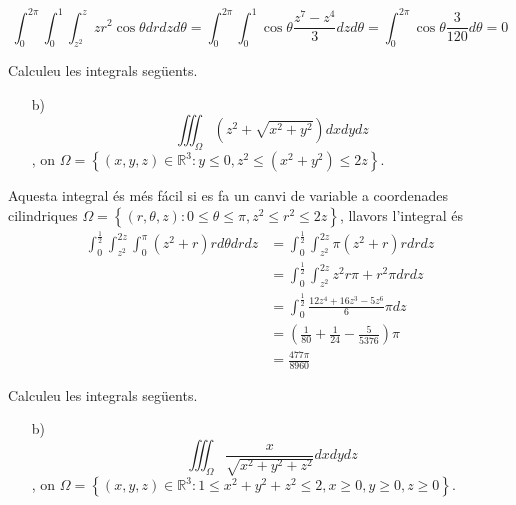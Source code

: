 \documentclass[a4paper, 12pt]{article}
\begin{document}
    \begin{solucio}
        $$\int_{0}^{2\pi}\int_{0}^{1}\int_{z^2}^{z} zr^2\cos{\theta} dr dz d\theta = \int_{0}^{2\pi}\int_{0}^{1} \cos{\theta} \frac{z^7-z^4}{3} dz d\theta = \int_{0}^{2\pi} \cos{\theta} \frac{3}{120} d\theta = 0$$
    \end{solucio}

    \setcounter{numex}{82}
    \begin{exercici}
        Calculeu les integrals següents.
        \begin{itemize}
            \item[b)] $$\iiint_\Omega (z^2+\sqrt{x^2+y^2}) dxdydz$$, on $\Omega = \left\{\left(x,y,z\right) \in \mathbb{R}^3 : y \leq 0, z^2\leq(x^2+y^2)\leq 2z\right\}$.
        \end{itemize}
    \end{exercici}

    \begin{solucio}
        Aquesta integral és més fácil si es fa un canvi de variable a coordenades cilindriques $\Omega = \left\{\left(r,\theta,z\right): 0 \leq \theta \leq \pi, z^2 \leq r^2 \leq 2z\right\}$,
        llavors l'integral és
        \begin{displaymath}
            \begin{split}
                \int_{0}^{\frac{1}{2}}\int_{z^2}^{2z}\int_{0}^{\pi}(z^2 + r)r d\theta drdz &= \int_{0}^{\frac{1}{2}}\int_{z^2}^{2z}\pi(z^2 + r)r drdz\\
                &= \int_{0}^{\frac{1}{2}}\int_{z^2}^{2z}z^2r\pi + r^2\pi drdz\\
                &= \int_{0}^{\frac{1}{2}}\frac{12z^4+16z^3-5z^6}{6}\pi dz\\
                &= \left(\frac{1}{80}+\frac{1}{24}-\frac{5}{5376}\right)\pi\\
                &= \frac{477\pi}{8960}
            \end{split}
        \end{displaymath}
    \end{solucio}

    \begin{exercici}
        Calculeu les integrals següents.
        \begin{itemize}
            \item[b)] $$\iiint_\Omega \frac{x}{\sqrt{x^2+y^2+z^2}} dxdydz$$, on $\Omega = \left\{\left(x,y,z\right) \in \mathbb{R}^3 : 1 \leq x^2+y^2+z^2\leq2, x \geq 0, y \geq 0, z \geq 0\right\}$.
        \end{itemize}
    \end{exercici}
\end{document}
